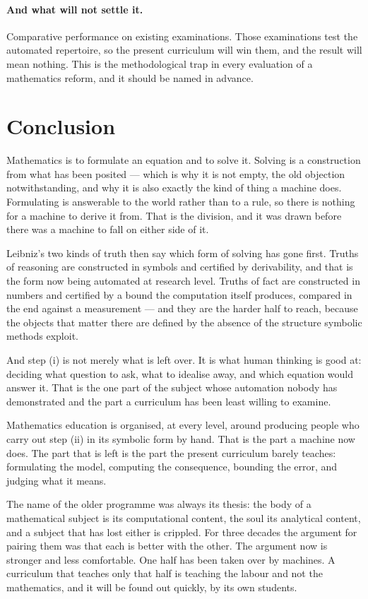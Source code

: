 \documentclass[11pt]{article}
\begin{document}
\paragraph{And what will not settle it.} Comparative performance on existing examinations. Those
examinations test the automated repertoire, so the present curriculum will win them, and the result
will mean nothing. This is the methodological trap in every evaluation of a mathematics reform, and
it should be named in advance.

\section{Conclusion}\label{sec:conclusion}

Mathematics is to formulate an equation and to solve it. Solving is a construction from what has
been posited --- which is why it is not empty, the old objection notwithstanding, and why it is also
exactly the kind of thing a machine does. Formulating is answerable to the world rather than to a
rule, so there is nothing for a machine to derive it from. That is the division, and it was drawn
before there was a machine to fall on either side of it.

Leibniz's two kinds of truth then say which form of solving has gone first. Truths of reasoning are
constructed in symbols and certified by derivability, and that is the form now being automated at
research level. Truths of fact are constructed in numbers and certified by a bound the computation
itself produces, compared in the end against a measurement --- and they are the harder half to
reach, because the objects that matter there are defined by the absence of the structure symbolic
methods exploit.

And step (i) is not merely what is left over. It is what human thinking is good at: deciding what
question to ask, what to idealise away, and which equation would answer it. That is the one part of
the subject whose automation nobody has demonstrated and the part a curriculum has been least
willing to examine.

Mathematics education is organised, at every level, around producing people who carry out step (ii)
in its symbolic form by hand. That is the part a machine now does. The part that is left is the part the present
curriculum barely teaches: formulating the model, computing the consequence, bounding the error, and
judging what it means.

The name of the older programme was always its thesis: the body of a mathematical subject is its
computational content, the soul its analytical content, and a subject that has lost either is
crippled. For three decades the argument for pairing them was that each is better with the other.
The argument now is stronger and less comfortable. One half has been taken over by machines. A
curriculum that teaches only that half is teaching the labour and not the mathematics, and it will
be found out quickly, by its own students.
\end{document}
